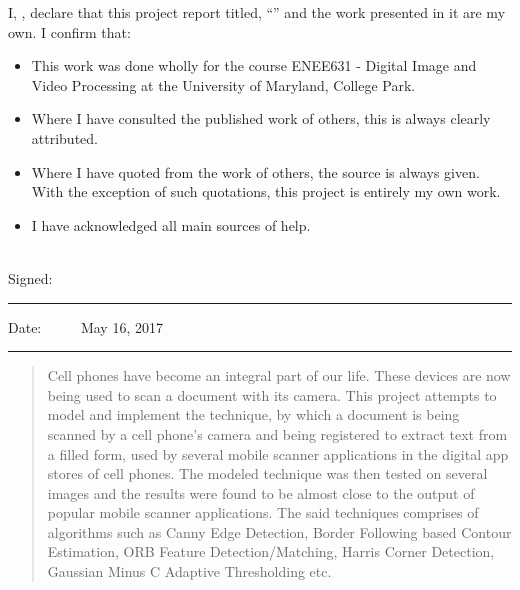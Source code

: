 \documentclass[
11pt, %
oneside, %
english, %
singlespacing, %
headsepline, %
chapterinoneline, %
]{MastersDoctoralThesis} %
\begin{document}
\begin{declaration}
\addchaptertocentry{\authorshipname} %
\noindent I, \authorname, declare that this project report titled, \enquote{\ttitle} and the work presented in it are my own. I confirm that:

\begin{itemize} 
\item This work was done wholly for the course ENEE631 - Digital Image and Video Processing at the University of Maryland, College Park.
\item Where I have consulted the published work of others, this is always clearly attributed.
\item Where I have quoted from the work of others, the source is always given. With the exception of such quotations, this project is entirely my own work.
\item I have acknowledged all main sources of help.
\\
\end{itemize}

\begin{minipage}[t]{0.8\textwidth}
\end{minipage}
\begin{minipage}[t]{0.8\textwidth}
	
\end{minipage}\\[3cm]
 
\noindent Signed:\\
\rule[0.5em]{25em}{0.5pt} %
 
\noindent Date: \ \ \ \ \  May 16, 2017\\
\rule[0.5em]{25em}{0.5pt} %
\end{declaration}

\cleardoublepage


\begin{abstract}
\addchaptertocentry{\abstractname} %
Cell phones have become an integral part of our life. These devices are now being used to scan a document with its camera. This project attempts to model and implement the technique, by which a document is being scanned by a cell phone's camera and being registered to extract text from a filled form, used by several mobile scanner applications in the digital app stores of cell phones. The modeled technique was then tested on several images and the results were found to be almost close to the output of popular mobile scanner applications. The said techniques comprises of algorithms such as Canny Edge Detection, Border Following based Contour Estimation, ORB Feature Detection/Matching, Harris Corner Detection, Gaussian Minus C Adaptive Thresholding etc.
\end{abstract}
\end{document}
